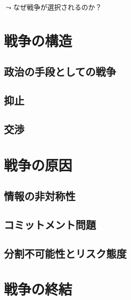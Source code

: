 \documentclass[
  xelatex,
  ja=standard]{bxjsarticle}
\begin{document}
\(\leadsto\)なぜ戦争が選択されるのか？

\hypertarget{ux6226ux4e89ux306eux69cbux9020}{%
\section{戦争の構造}\label{ux6226ux4e89ux306eux69cbux9020}}

\hypertarget{ux653fux6cbbux306eux624bux6bb5ux3068ux3057ux3066ux306eux6226ux4e89}{%
\subsection{政治の手段としての戦争}\label{ux653fux6cbbux306eux624bux6bb5ux3068ux3057ux3066ux306eux6226ux4e89}}

\hypertarget{ux6291ux6b62}{%
\subsection{抑止}\label{ux6291ux6b62}}

\hypertarget{ux4ea4ux6e09}{%
\subsection{交渉}\label{ux4ea4ux6e09}}

\hypertarget{ux6226ux4e89ux306eux539fux56e0}{%
\section{戦争の原因}\label{ux6226ux4e89ux306eux539fux56e0}}

\hypertarget{ux60c5ux5831ux306eux975eux5bfeux79f0ux6027}{%
\subsection{情報の非対称性}\label{ux60c5ux5831ux306eux975eux5bfeux79f0ux6027}}

\hypertarget{ux30b3ux30dfux30c3ux30c8ux30e1ux30f3ux30c8ux554fux984c}{%
\subsection{コミットメント問題}\label{ux30b3ux30dfux30c3ux30c8ux30e1ux30f3ux30c8ux554fux984c}}

\hypertarget{ux5206ux5272ux4e0dux53efux80fdux6027ux3068ux30eaux30b9ux30afux614bux5ea6}{%
\subsection{分割不可能性とリスク態度}\label{ux5206ux5272ux4e0dux53efux80fdux6027ux3068ux30eaux30b9ux30afux614bux5ea6}}

\hypertarget{ux6226ux4e89ux306eux7d42ux7d50}{%
\section{戦争の終結}\label{ux6226ux4e89ux306eux7d42ux7d50}}


\renewcommand\refname{補論：交渉可能領域の存在}
  
\end{document}

